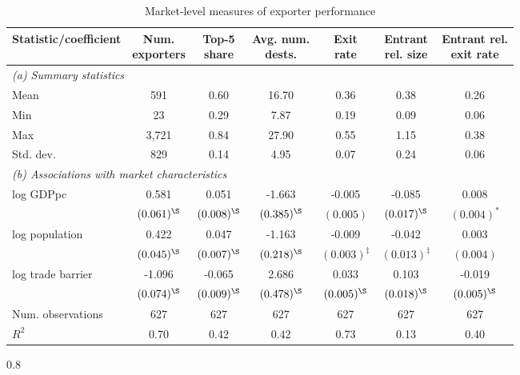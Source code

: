\begin{table}[h!]
\footnotesize
\renewcommand{\arraystretch}{1.2}
\begin{center}
\caption{Market-level measures of exporter performance}
\label{tab:sumstats_regs}
\begin{tabular}{lcccccc}\toprule
Statistic/coefficient& \makecell{Num.\\exporters}& \makecell{Top-5\\share}& \makecell{Avg. num.\\dests.}& \makecell{Exit\\rate}& \makecell{Entrant\\rel. size}& \makecell{Entrant rel.\\exit rate}\\
\midrule
\multicolumn{7}{l}{\textit{(a) Summary statistics}}\\[4pt]
Mean& 591& 0.60& 16.70& 0.36& 0.38& 0.26\\
Min& 23& 0.29& 7.87& 0.19& 0.09& 0.06\\
Max& 3,721& 0.84& 27.90& 0.55& 1.15& 0.38\\
Std. dev.& 829& 0.14& 4.95& 0.07& 0.24& 0.06\\
\midrule\multicolumn{7}{l}{\textit{(b) Associations with market characteristics}}\\[4pt]
log GDPpc& 0.581& 0.051& -1.663& -0.005& -0.085& 0.008\\
& $(0.061)^\S$& $(0.008)^\S$& $(0.385)^\S$& $(0.005)$& $(0.017)^\S$& $(0.004)^*$\\[4pt]
log population& 0.422& 0.047& -1.163& -0.009& -0.042& 0.003\\
& $(0.045)^\S$& $(0.007)^\S$& $(0.218)^\S$& $(0.003)^\ddagger$& $(0.013)^\ddagger$& $(0.004)$\\[4pt]
log trade barrier& -1.096& -0.065& 2.686& 0.033& 0.103& -0.019\\
& $(0.074)^\S$& $(0.009)^\S$& $(0.478)^\S$& $(0.005)^\S$& $(0.018)^\S$& $(0.005)^\S$\\[4pt]
Num. observations& 627& 627& 627& 627& 627& 627\\
$R^2$& 0.70& 0.42& 0.42& 0.73& 0.13& 0.40\\
\bottomrule
\end{tabular}
\vspace{-0.1cm}
\begin{fignote2}{0.8\textwidth}

\end{fignote2}
\end{center}
\end{table}
